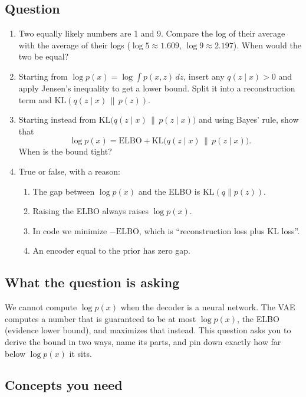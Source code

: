 \documentclass[12pt,a4paper]{article}
\begin{document}
\subsection{Question}

\begin{enumerate}[label=(\alph*)]
  \item Two equally likely numbers are 1 and 9. Compare the log of their average with the average of their logs ($\log5\approx1.609$, $\log9\approx2.197$). When would the two be equal?
  \item Starting from $\log p(x)=\log\int p(x,z)\,dz$, insert any $q(z\mid x)>0$ and apply Jensen's inequality to get a lower bound. Split it into a reconstruction term and $\mathrm{KL}(q(z\mid x)\,\|\,p(z))$.
  \item Starting instead from $\mathrm{KL}\big(q(z\mid x)\,\|\,p(z\mid x)\big)$ and using Bayes' rule, show that
  \[
  \log p(x)=\text{ELBO}+\mathrm{KL}\big(q(z\mid x)\,\|\,p(z\mid x)\big).
  \]
  When is the bound tight?
  \item True or false, with a reason:
  \begin{enumerate}[label=(\roman*)]
    \item The gap between $\log p(x)$ and the ELBO is $\mathrm{KL}(q\|p(z))$.
    \item Raising the ELBO always raises $\log p(x)$.
    \item In code we minimize $-\text{ELBO}$, which is ``reconstruction loss plus KL loss''.
    \item An encoder equal to the prior has zero gap.
  \end{enumerate}
\end{enumerate}

\subsection{What the question is asking}

We cannot compute $\log p(x)$ when the decoder is a neural network. The VAE computes a number that is guaranteed to be at most $\log p(x)$, the ELBO (evidence lower bound), and maximizes that instead. This question asks you to derive the bound in two ways, name its parts, and pin down exactly how far below $\log p(x)$ it sits.

\subsection{Concepts you need}
\end{document}
